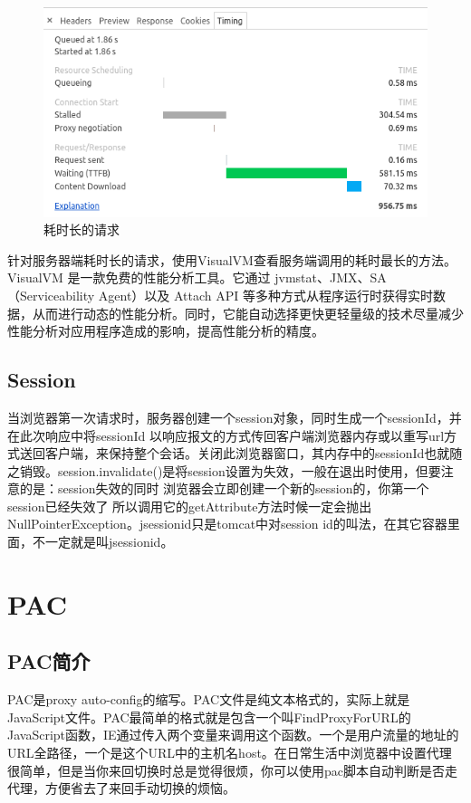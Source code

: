 \documentclass[letter]{book}
\begin{document}
\begin{figure}[htbp]
	\centering
	\includegraphics[scale=0.6]{longtimerequest.png}
	\caption{耗时长的请求}
	\label{fig:longtimerequest}
\end{figure}

针对服务器端耗时长的请求，使用VisualVM查看服务端调用的耗时最长的方法。VisualVM 是一款免费的性能分析工具。它通过 jvmstat、JMX、SA（Serviceability Agent）以及 Attach API 等多种方式从程序运行时获得实时数据，从而进行动态的性能分析。同时，它能自动选择更快更轻量级的技术尽量减少性能分析对应用程序造成的影响，提高性能分析的精度。

\subsection{Session}

当浏览器第一次请求时，服务器创建一个session对象，同时生成一个sessionId，并在此次响应中将sessionId 以响应报文的方式传回客户端浏览器内存或以重写url方式送回客户端，来保持整个会话。关闭此浏览器窗口，其内存中的sessionId也就随之销毁。session.invalidate()是将session设置为失效，一般在退出时使用，但要注意的是：session失效的同时 浏览器会立即创建一个新的session的，你第一个session已经失效了 所以调用它的getAttribute方法时候一定会抛出NullPointerException。jsessionid只是tomcat中对session id的叫法，在其它容器里面，不一定就是叫jsessionid。


\section{PAC}

\subsection{PAC简介}

PAC是proxy auto-config的缩写。PAC文件是纯文本格式的，实际上就是JavaScript文件。PAC最简单的格式就是包含一个叫FindProxyForURL的JavaScript函数，IE通过传入两个变量来调用这个函数。一个是用户流量的地址的URL全路径，一个是这个URL中的主机名host。在日常生活中浏览器中设置代理很简单，但是当你来回切换时总是觉得很烦，你可以使用pac脚本自动判断是否走代理，方便省去了来回手动切换的烦恼。
\end{document}
